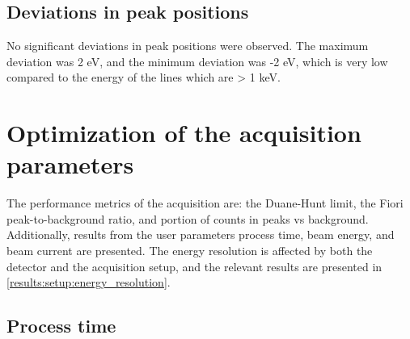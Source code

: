 


\subsection*{Deviations in peak positions}
\label{results:setup:peak_positions}

No significant deviations in peak positions were observed.
The maximum deviation was 2 eV, and the minimum deviation was -2 eV, which is very low compared to the energy of the lines which are > 1 keV.



















\section{Optimization of the acquisition parameters}
\label{results:acquisition_parameters}

The performance metrics of the acquisition are: the Duane-Hunt limit, the Fiori peak-to-background ratio, and portion of counts in peaks vs background.
Additionally, results from the user parameters process time, beam energy, and beam current are presented.
The energy resolution is affected by both the detector and the acquisition setup, and the relevant results are presented in \cref{results:setup:energy_resolution}.



\subsection{Process time}
\label{results:process_time}

